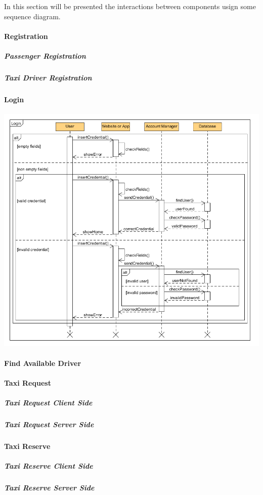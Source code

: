 In this section will be presented the interactions between components usign some sequence diagram.

\paragraph{Registration}
	\subparagraph{Passenger Registration}
	\subparagraph{Taxi Driver Registration}
\newpage
\paragraph{Login}
\begin{center}
	\includegraphics[width=\textwidth]{diagrams/Login.png}
\end{center}
\paragraph{Find Available Driver}

\paragraph{Taxi Request}
	\subparagraph{Taxi Request Client Side}
	\subparagraph{Taxi Request Server Side}

\paragraph{Taxi Reserve}
	\subparagraph{Taxi Reserve Client Side}
	\subparagraph{Taxi Reserve Server Side}